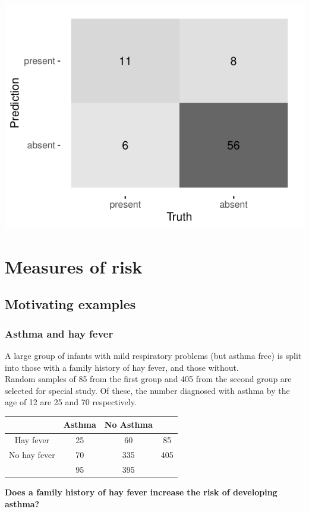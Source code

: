 \documentclass[a4paper]{article}
\begin{document}
\begin{Schunk}
{\centering \includegraphics[width=\maxwidth]{figure/listings-unnamed-chunk-39-1} 

}

\end{Schunk}


\section{Measures of risk}\label{sec:6}
\subsection{Motivating examples}
\subsubsection{Asthma and hay fever}
A large group of infants with mild respiratory problems (but asthma free) is split into those with a family history of hay fever, and those without.\\
Random samples of 85 from the first group and 405 from the second group are selected for special study. Of these, the number diagnosed with asthma by the age of 12 are 25 and 70 respectively.
\begin{table}[H]
	\centering
	\begin{tabular}{@{}ccc|c@{}}
	\toprule
				 & Asthma & No Asthma &     \\ \midrule
	Hay fever    & 25    & 60        & 85  \\
	No hay fever & 70    & 335       & 405 \\ \midrule
				 & 95    & 395       &     \\ \bottomrule
	\end{tabular}
\end{table}
\begin{greenbox}
	\textbf{Does a family history of hay fever increase the risk of developing asthma?}
\end{greenbox}
\end{document}

